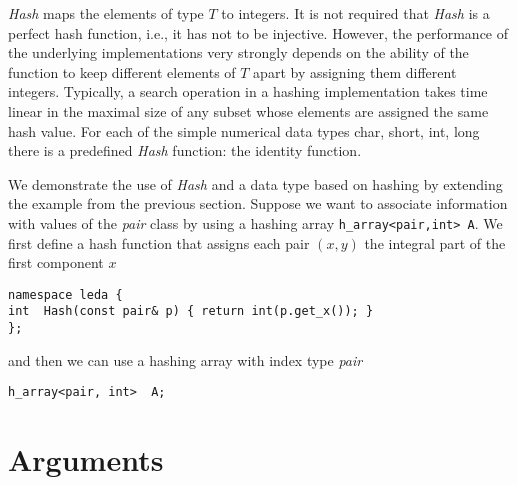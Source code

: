 {\it Hash} maps the elements of type $T$ to integers. It is not
required that {\it Hash} is a perfect hash function, i.e., it has not to be
injective. However, the performance of the underlying implementations
very strongly depends on the ability of the function to keep different
elements of $T$ apart by assigning them different integers.
Typically, a search operation in a hashing implementation takes time
linear in the maximal size of any subset whose elements are assigned the
same hash value.  For each of the simple numerical data types char, short, 
int, long there is a predefined {\it Hash} function: the identity function.

We demonstrate the use of {\it Hash} and a data type based on hashing
by extending the example from the previous section. Suppose we
want to associate information with values of the {\it pair} class
by using a hashing array \texttt{h\_array<pair,int> A}. We first
define a hash function that assigns each pair $(x,y)$
the integral part of the first component $x$
\begin{verbatim}
namespace leda {
int  Hash(const pair& p) { return int(p.get_x()); }
};
\end{verbatim}

and then we  can use a hashing array with index type {\it pair}
\begin{verbatim}
h_array<pair, int>  A;
\end{verbatim}


\section{Arguments}

